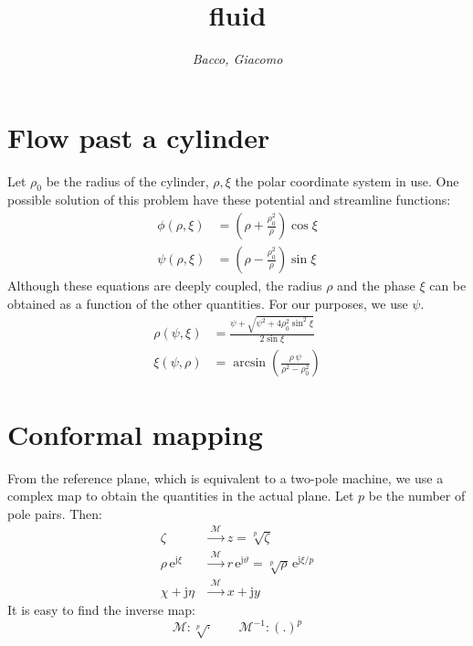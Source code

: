 \documentclass[b5paper,11pt,oneside,fleqn]{article}
\title{\raggedleft\sffamily\Huge fluid}
\author{\sffamily\itshape Bacco, Giacomo}
\date{}
\newcommand{\eu}{\mathrm{e}}
\newcommand{\je}{\mathrm{j}}
\begin{document}
\maketitle

\section{Flow past a cylinder}

Let $ \rho_0 $ be the radius of the cylinder, $ \rho,\xi $ the polar coordinate 
system in use.
One possible solution of this problem have these potential and streamline 
functions:
\begin{align}
\phi(\rho,\xi) &= \left( \rho + \frac{\rho_0^2}{\rho} \right) \cos\xi \\[1ex]
\psi(\rho,\xi) &= \left( \rho - \frac{\rho_0^2}{\rho} \right) \sin\xi 
\end{align}
Although these equations are deeply coupled, the radius $ \rho $ and the phase 
$ \xi $ can be obtained as a function of the other quantities.
For our purposes, we use $ \psi $.
\begin{align}
\rho(\psi,\xi) &= \frac{\psi + \sqrt{\psi^2 + 4\rho_0^2 \sin^2\xi}}{2\sin\xi} 
\\[1ex]
\xi(\psi,\rho) &= \arcsin \left( \frac{\rho\, \psi}{\rho^2 - \rho_0^2} \right)  
\end{align}



\section{Conformal mapping}
From the reference plane, which is equivalent to a two-pole machine,
we use a complex map to obtain the quantities in the actual plane.
Let $ p $ be the number of pole pairs. Then:
\begin{equation}
\begin{aligned}
\zeta              &\xrightarrow{\;\mathcal{M}\;} z = \sqrt[p]{\zeta} \\
\rho\,\eu^{\je\xi} &\xrightarrow{\;\mathcal{M}\;}
                       r \, \eu^{\je\vartheta} = \sqrt[p]{\rho}\,\eu^{\je 
                       \xi/p} \\
\chi + \je\eta     &\xrightarrow{\;\mathcal{M}\;} x + \je y 
\end{aligned}
\end{equation}
%
It is easy to find the inverse map:
\begin{equation}
\mathcal{M}\colon \sqrt[p]{\cdot} \qquad 
\mathcal{M}^{-1}\colon (.)^p
\end{equation}
\end{document}
